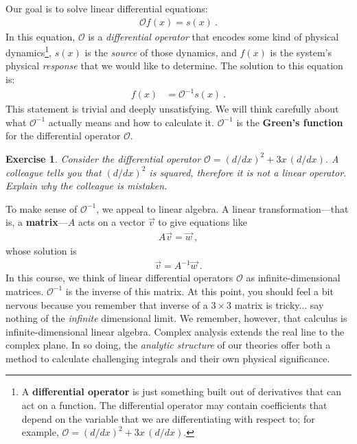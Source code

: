\documentclass[
  11pt,
	colorful,
	raggedright,
]{tufte-style-thesis-flip}
\newtheorem{exercise}{Exercise}[section]
\begin{document}
Our goal is to solve linear differential equations:
\begin{align}
  \mathcal O f(x) = s(x) \ .
  \label{eq:greens:function:equation}
\end{align}
In this equation, $\mathcal O$ is a \emph{differential operator} that encodes some kind of physical dynamics\footnote{A \textbf{differential operator} is just something built out of derivatives that can act on a function. The differential operator may contain coefficients that depend on the variable that we are differentiating with respect to; for example, $\mathcal O = (d/dx)^2 + 3x\,(d/dx)$.}, $s(x)$ is the \emph{source} of those dynamics, and $f(x)$ is the system's physical \emph{response} that we would like to determine. The solution to this equation is:
\begin{align}
  f(x) &= \mathcal O^{-1} s(x) \ .
\end{align}
This statement is trivial and deeply unsatisfying. We will think carefully about what $\mathcal O^{-1}$ actually means and how to calculate it. $\mathcal O^{-1}$ is the \textbf{Green's function} for the differential operator $\mathcal O$. %

\begin{exercise}
Consider the differential operator $\mathcal O = (d/dx)^2 + 3x\,(d/dx)$. A colleague tells you that $(d/dx)^2$ is squared, therefore it is not a linear operator. Explain why the colleague is mistaken. 
\end{exercise}

To make sense of $\mathcal O^{-1}$, we appeal to linear algebra. A linear transformation---that is, a \textbf{matrix}---$A$ acts on a vector $\vec{v}$ to give equations like
\begin{align}
  A \vec{v} = \vec{w} \ ,
\end{align}
whose solution is
\begin{align}
  \vec{v} = A^{-1} \vec{w} \ .
\end{align}
In this course, we think of linear differential operators $\mathcal O$ as infinite-dimensional matrices. $\mathcal O^{-1}$ is the inverse of this matrix. At this point, you should feel a bit nervous because you remember that inverse of a $3\times 3$ matrix is tricky... say nothing of the \emph{infinite} dimensional limit. We remember, however, that calculus is infinite-dimensional linear algebra. Complex analysis extends the real line to the complex plane. In so doing, the \emph{analytic structure} of our theories offer both a method to calculate challenging integrals and their own physical significance. 
\end{document}
